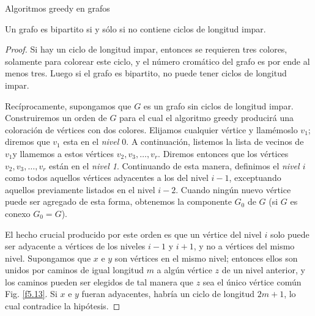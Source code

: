 \begin{section}{Algoritmos greedy en grafos}
\begin{comment}
        \SetVertexSimple[Shape=circle,MinSize=5 pt,FillColor=white]
        \Vertex[x=0.00, y=0.00]{0}
        \Vertex[x=2.00, y=0.00]{1}
        \Vertex[x=0.0, y=-1.00]{2}
        \Vertex[x=2.00 , y=-1.00]{3}
        \Vertex[x=2.00, y=-2.00]{4}
        \Vertex[x=0.00 , y=-2.00]{5}
        \Vertex[x=2.00, y=-3.00]{6}
        \Vertex[x=0.00, y=-3.00]{7}
        \Edges(0,1,2,3,0,4,5,6,7,4)
        \Edges(1,5)
        \Edges(2,6)
        \Edges(3,7)
        \draw (-0.4,0) node {1};
        \draw (-0.4,-1) node {1};
        \draw (-0.4,-2) node {1};
        \draw (-0.4,-3) node {1};
        \draw (2.4,0) node {2};
        \draw (2.4,-1) node {2};
        \draw (2.4,-2) node {2};
        \draw (2.4,-3) node {2};
        \end{tikzpicture}
    \end{tabular}
\end{center}
\caption{El cubo es un grafo bipartito} \label{f5.12}
\end{figure}
\end{comment}

\begin{teorema}\label{t5.7.2} Un grafo es bipartito si  y sólo si no contiene ciclos de longitud impar.
\end{teorema}
\begin{proof} Si hay un ciclo de longitud impar, entonces se requieren tres colores, solamente para colorear este ciclo, y el número cromático del grafo es por ende al menos tres. Luego si el grafo es bipartito, no puede tener ciclos de longitud impar.

Recíprocamente, supongamos que $G$ es un grafo sin ciclos de longitud impar. Construiremos un orden de $G$ para el cual el algoritmo greedy producirá una coloración de vértices con dos colores. Elijamos cualquier vértice y llamémoslo $v_1$; diremos que $v_1$ esta en el \textit{nivel $0$}. A continuación, listemos la
lista de vecinos de $v_1$y llamemos a estos vértices  $v_2,v_3,\dots,v_r$. Diremos entonces que los vértices  $v_2,v_3,\dots,v_r$ están en el  \textit{nivel 1}. Continuando de esta manera, definimos el  \textit{nivel $i$} como todos aquellos vértices adyacentes a los del {nivel $i-1$}, exceptuando aquellos previamente listados en el {nivel
$i-2$}. Cuando ningún nuevo vértice puede ser agregado de esta forma, obtenemos la componente $G_0$ de $G$ (si $G$ es conexo $G_0=G$).

El hecho crucial producido por este orden es que un vértice del nivel $i$ solo puede ser adyacente a vértices de los niveles $i-1$ y $i+1$, y no a vértices del mismo nivel. Supongamos que $x$ e $y$ son vértices en el mismo nivel; entonces ellos son unidos por caminos de igual longitud $m$ a algún vértice $z$ de un nivel anterior, y los caminos pueden ser elegidos de tal manera que $z$ sea el único vértice común Fig. \ref{f5.13}. Si $x$ e $y$ fueran adyacentes, habría un ciclo de longitud $2m+1$, lo cual contradice
la hipótesis. 


\end{proof}
\end{section}

